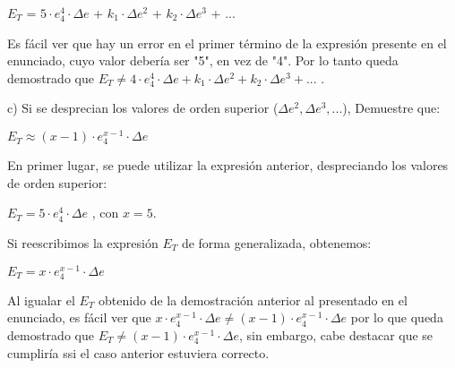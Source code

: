 \documentclass[]{article}
\begin{document}
\begin{center}
	$E_{T}$ = $5\cdot{e^{4}_{4}}\cdot\Delta{e}$	+ $k_{1}\cdot\Delta{e^{2}}$ + $k_{2}\cdot\Delta{e^{3}}$ + ...\\
\end{center}

\begin{flushleft}
	Es fácil ver que hay un error en el primer término de la expresión presente en el enunciado, cuyo valor debería ser "5", en vez de "4".
Por lo tanto queda demostrado que $E_{T} \neq 4 \cdot e_{4}^4 \cdot \Delta e + k_{1} \cdot \Delta {e}^2 + k_{2} \cdot \Delta e^{3} + ...$ . \\
\end{flushleft}
	

\begin{flushleft}
	c) Si se desprecian los valores de orden superior ($\Delta e^{2}, \Delta e^{3}, ...$), Demuestre que: \\
\end{flushleft}

\begin{center} $E_{T} \approx (x-1) \cdot e_{4}^{x-1}\cdot \Delta e$
\end{center}

	
\begin{flushleft}
	En primer lugar, se puede utilizar la expresión anterior, despreciando los valores de orden superior:

\end{flushleft}
\begin{center}
	$E_{T} = 5\cdot{e^{4}_{4}}\cdot\Delta{e}$ , con $x = 5$.
\end{center}

\begin{flushleft}
	Si reescribimos la expresión $E_{T}$ de forma generalizada, obtenemos:
\end{flushleft}

\begin{center}
	$E_{T} = x\cdot{e_{4}^{x-1}}\cdot\Delta{e}$ 
\end{center}

\begin{flushleft}
	Al igualar el $E_{T}$ obtenido de la demostración anterior al presentado en el enunciado, es fácil ver que $x\cdot{e_{4}^{x-1}}\cdot\Delta{e} \neq (x-1) \cdot e_{4}^{x-1}\cdot \Delta e$ por lo que queda demostrado que $E_{T} \neq (x-1) \cdot e_{4}^{x-1}\cdot \Delta e$, sin embargo, cabe destacar que se cumpliría ssi el caso anterior estuviera correcto.\\
\end{flushleft}
\end{document}
